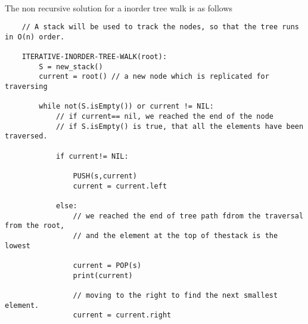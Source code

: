 \documentclass[11pt]{article}
\theoremstyle{definition}
\newcommand{\solution}{\medskip\noindent{\color{DarkBlue}\textbf{Solution:}}}
\begin{document}
\solution \\

The non recursive solution for a inorder tree walk is as follows

\begin{verbatim}
    // A stack will be used to track the nodes, so that the tree runs in O(n) order.

    ITERATIVE-INORDER-TREE-WALK(root):
        S = new_stack()
        current = root() // a new node which is replicated for traversing

        while not(S.isEmpty()) or current != NIL:
            // if current== nil, we reached the end of the node
            // if S.isEmpty() is true, that all the elements have been traversed.

            if current!= NIL:

                PUSH(s,current)
                current = current.left
            
            else:
                // we reached the end of tree path fdrom the traversal from the root,
                // and the element at the top of thestack is the lowest

                current = POP(s)
                print(current)

                // moving to the right to find the next smallest element.
                current = current.right 


\end{verbatim}
\end{document}
